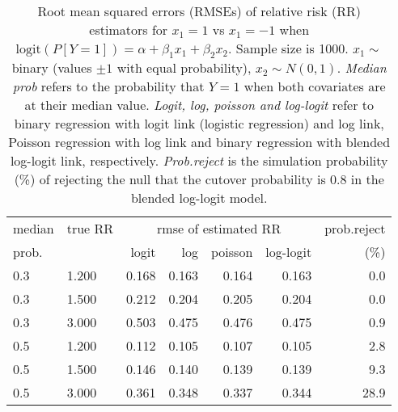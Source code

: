 \documentclass[12pt,a4paper]{article}
\begin{document}
\begin{table}[H] 
\small\sf\centering 
\caption{Root mean squared errors (RMSEs) of relative risk (RR) estimators for $x_1=1$ vs $x_1=-1$ when $\mbox{logit}(P[Y=1])=\alpha+\beta_1 x_1 + \beta_2 x_2$. Sample size is 1000. $x_1 \sim $binary (values $\pm 1$ with equal probability), $x_2 \sim N(0,1)$. {\it Median prob} refers to the probability that $Y=1$ when both covariates are at their median value. {\it Logit, log, poisson and log-logit} refer to binary regression with logit link (logistic regression) and log link, Poisson regression with log link and binary regression with blended log-logit link, respectively. {\it Prob.reject} is the simulation probability (\%) of rejecting the null that the cutover probability is $0.8$ in the blended log-logit model.} 
\begin{tabular}{llrrrrr} 
\toprule 
median & true RR & \multicolumn{4}{c}{rmse of estimated RR} & prob.reject \\ 
prob. & & logit & log & poisson & log-logit  & (\%) \\ \midrule 
0.3 & 1.200 & 0.168 & 0.163 & 0.164 & 0.163 &  0.0 \\  
0.3 & 1.500 & 0.212 & 0.204 & 0.205 & 0.204 &  0.0 \\  
0.3 & 3.000 & 0.503 & 0.475 & 0.476 & 0.475 &  0.9 \\  
0.5 & 1.200 & 0.112 & 0.105 & 0.107 & 0.105 &  2.8 \\  
0.5 & 1.500 & 0.146 & 0.140 & 0.139 & 0.139 &  9.3 \\  
0.5 & 3.000 & 0.361 & 0.348 & 0.337 & 0.344 & 28.9 \\  
\bottomrule 
\end{tabular} 
\end{table} 
\end{document}
